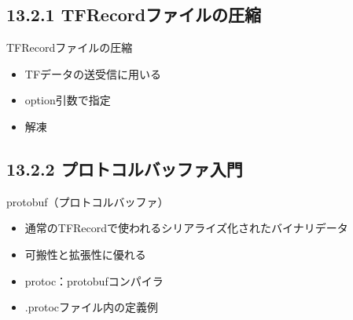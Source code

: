 \documentclass[aspectratio=169, dvipdfmx, 14pt, xcolor={svgnames,dvipsnames}, t]{beamer}
\begin{document}

\hypertarget{tfrecordux30d5ux30a1ux30a4ux30ebux306eux5727ux7e2e}{%
  \subsection{13.2.1 TFRecordファイルの圧縮}\label{tfrecordux30d5ux30a1ux30a4ux30ebux306eux5727ux7e2e}}


\begin{frame}{TFRecordファイルの圧縮}

  \begin{itemize}
    \tightlist
    \item
          \alert{TFデータの送受信}に用いる
    \item
          option引数で指定
    \item
          解凍
  \end{itemize}

\end{frame}


\hypertarget{ux30d7ux30edux30c8ux30b3ux30ebux30d0ux30c3ux30d5ux30a1ux5165ux9580}{%
  \subsection{13.2.2 プロトコルバッファ入門}\label{ux30d7ux30edux30c8ux30b3ux30ebux30d0ux30c3ux30d5ux30a1ux5165ux9580}}


\begin{frame}{protobuf（プロトコルバッファ）}

  \begin{itemize}
    \tightlist
    \item
          通常のTFRecordで使われる\alert{シリアライズ化されたバイナリデータ}
    \item
          \alert{可搬性}と\alert{拡張性}に優れる
    \item
          protoc：protobufコンパイラ
    \item
          .protocファイル内の定義例
  \end{itemize}

\end{frame}

\end{document}
